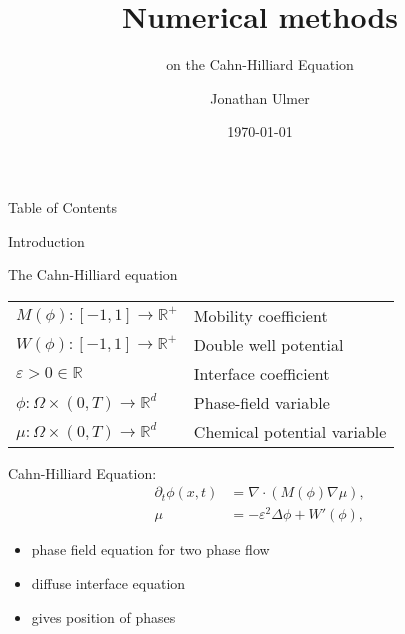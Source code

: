 \documentclass[presentation]{beamer}
\author{Jonathan Ulmer}
\date{\today}
\title{Numerical methods}
\subtitle{on the Cahn-Hilliard Equation}
\begin{document}
\maketitle
\begin{frame}[label={sec:orgd620e75}]{Table of Contents}
\end{frame}
\begin{frame}[label={sec:org1caa142}]{Introduction}
\end{frame}

\begin{frame}[label={sec:orga77819f}]{The Cahn-Hilliard equation}
\begin{center}
\begin{tabular}{ll}
\(M(\phi): [-1,1] \to \mathbb{R}^+\) & Mobility coefficient\\
\(W(\phi): [-1,1] \to \mathbb{R}^+\) & Double well potential\\
\(\varepsilon > 0 \in \mathbb{R}\) & Interface coefficient\\
\(\phi : \Omega \times (0,T) \to \mathbb{R}^d\) & Phase-field \alert{variable}\\
\(\mu : \Omega \times (0,T) \to \mathbb{R}^d\) & Chemical potential \alert{variable}\\
\end{tabular}
\end{center}
\begin{block}{Cahn-Hilliard Equation:}
\begin{equation}
\label{eq:CH}
\begin{aligned}
\partial_{t}\phi(x,t) &=  \nabla \cdot(M(\phi)\nabla\mu), \\
\mu &= - \varepsilon^2 \Delta\phi  + W'(\phi),
\end{aligned}
\end{equation}
\begin{itemize}
\item phase field equation for two phase flow
\item diffuse interface equation
\item gives position of phases
\end{itemize}


\end{block}
\end{frame}
\end{document}
